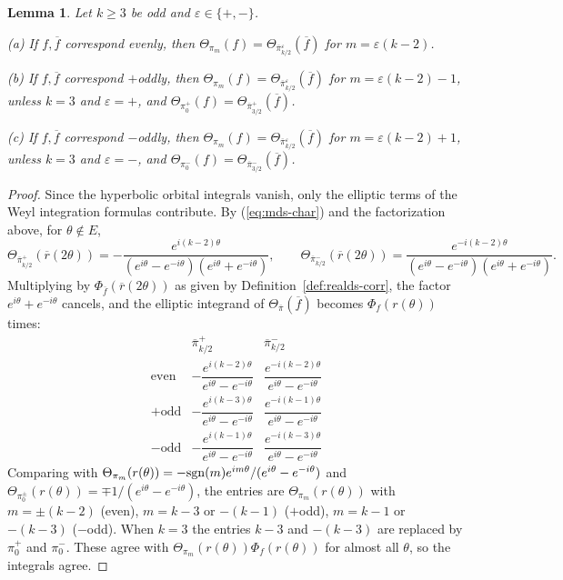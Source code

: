 \documentclass[12pt,letterpaper]{book}
\theoremstyle{plain}
\newtheorem{lemma}[theorem]{Lemma}
\theoremstyle{definition}
\theoremstyle{remark}
\theoremstyle{remark}
\DeclareMathOperator{\sgn}{sgn}
\begin{document}
\begin{lemma}\label{lem:realds}
Let $k\geq3$ be odd and $\varepsilon\in\{+,-\}$.

(a) If $f,\overline{f}$ correspond evenly, then
$\Theta _{\pi _m}(f)
=\Theta _{\overline{\pi }{}_{k/2}^\varepsilon }(\overline{f})$ for
$m=\varepsilon (k-2)$.

(b) If $f,\overline{f}$ correspond $+$oddly, then
$\Theta _{\pi _m}(f)
=\Theta _{\overline{\pi }{}_{k/2}^\varepsilon }(\overline{f})$ for
$m=\varepsilon (k-2)-1$, unless $k=3$ and
$\varepsilon =+$, and
$\Theta _{\pi _{0}^{+}}(f)=\Theta _{\overline{\pi }{}_{3/2}^{+}}(\overline{f})$.

(c) If $f,\overline{f}$ correspond $-$oddly, then
$\Theta _{\pi _m}(f)
=\Theta _{\overline{\pi }{}_{k/2}^\varepsilon }(\overline{f})$ for
$m=\varepsilon (k-2)+1$, unless $k=3$ and
$\varepsilon =-$, and
$\Theta _{\pi _{0}^{-}}(f)=\Theta _{\overline{\pi }{}_{3/2}^{-}}(\overline{f})$.
\end{lemma}

\begin{proof}
Since the hyperbolic orbital integrals vanish, only the elliptic terms
of the Weyl integration formulas contribute. By (\ref{eq:mds-char}) and
the factorization above, for $\theta\notin E$,
\[
\Theta_{\overline{\pi}{}^{+}_{k/2}}(\overline r(2\theta))
=-\frac{e^{i(k-2)\theta}}{(e^{i\theta}-e^{-i\theta})(e^{i\theta}+e^{-i\theta})},
\qquad
\Theta_{\overline{\pi}{}^{-}_{k/2}}(\overline r(2\theta))
=\frac{e^{-i(k-2)\theta}}{(e^{i\theta}-e^{-i\theta})(e^{i\theta}+e^{-i\theta})}.
\]
Multiplying by $\Phi_{\overline f}(\overline r(2\theta))$ as given by
Definition~\ref{def:realds-corr}, the factor $e^{i\theta}+e^{-i\theta}$
cancels, and the elliptic integrand of $\Theta_{\overline\pi}(\overline f)$
becomes $\Phi_f(r(\theta))$ times:
\[
\renewcommand{\arraystretch}{1.6}
\begin{array}{c|cc}
 & \overline{\pi}{}^{+}_{k/2} & \overline{\pi}{}^{-}_{k/2}\\ \hline
\text{even} & -\dfrac{e^{i(k-2)\theta}}{e^{i\theta}-e^{-i\theta}}
 & \dfrac{e^{-i(k-2)\theta}}{e^{i\theta}-e^{-i\theta}}\\
+\text{odd} & -\dfrac{e^{i(k-3)\theta}}{e^{i\theta}-e^{-i\theta}}
 & \dfrac{e^{-i(k-1)\theta}}{e^{i\theta}-e^{-i\theta}}\\
-\text{odd} & -\dfrac{e^{i(k-1)\theta}}{e^{i\theta}-e^{-i\theta}}
 & \dfrac{e^{-i(k-3)\theta}}{e^{i\theta}-e^{-i\theta}}
\end{array}
\]
Comparing with
$\Theta_{\pi_m}(r(\theta))=-{\rm \sgn}(m)e^{im\theta}/(e^{i\theta}-e^{-i\theta})$
and $\Theta_{\pi_0^{\pm}}(r(\theta))=\mp1/(e^{i\theta}-e^{-i\theta})$, the
entries are $\Theta_{\pi_m}(r(\theta))$ with $m=\pm(k-2)$ (even),
$m=k-3$ or $-(k-1)$ ($+$odd), $m=k-1$ or $-(k-3)$ ($-$odd). When $k=3$
the entries $k-3$ and $-(k-3)$ are replaced by $\pi_0^+$ and $\pi_0^-$.
These agree with $\Theta_{\pi_m}(r(\theta))\Phi_f(r(\theta))$ for almost
all $\theta$, so the integrals agree.
\end{proof}
\end{document}
